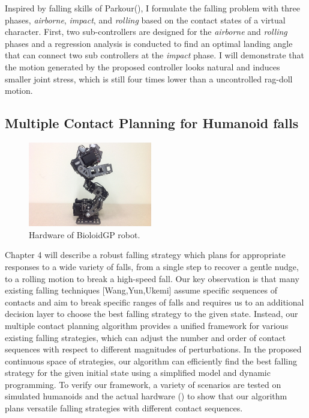 Inspired by falling skills of Parkour(), 
I formulate the falling problem
with three phases, \emph{airborne}, \emph{impact}, and \emph{rolling}
based on the contact states of a virtual character.
First, two sub-controllers are designed for the \emph{airborne} and
\emph{rolling} phases and a regression analysis is conducted to find 
an optimal landing angle that can connect two sub controllers at the
\emph{impact} phase.
I will demonstrate that the motion generated by the proposed controller
looks natural and induces smaller joint stress, which is still four times lower
than a uncontrolled rag-doll motion.



\subsection{Multiple Contact Planning for Humanoid falls}
\begin{figure}
 \vspace{-25pt}
  \begin{center}
    \includegraphics[width=0.48\textwidth]{images/intro_hardware.jpg}
  \end{center}
   \vspace{-25pt}
  \caption{Hardware of BioloidGP robot.}
   \vspace{-10pt}
  \label{fig:intro_hardware}
\end{figure}
Chapter 4 will describe a robust falling strategy which plans for appropriate 
responses to a wide variety of falls, from a single step to recover a gentle
nudge, to a rolling motion to break a high-speed fall.
Our key observation is that  many existing falling techniques [Wang,Yun,Ukemi]
assume specific sequences of contacts and aim to break specific ranges of
falls and requires us to an additional decision layer to choose the best
falling strategy to the given state.
Instead, our multiple contact planning algorithm provides a unified framework
for various existing falling strategies, which can adjust the number and order
of contact sequences with respect to different magnitudes of perturbations.
In the proposed continuous space of strategies, our algorithm can efficiently
find the best falling strategy for the given initial state using a simplified
model and dynamic  programming.
To verify our framework, a variety of scenarios are tested on simulated
humanoids and the actual hardware () to show that our
algorithm plans versatile falling strategies with different contact sequences.

